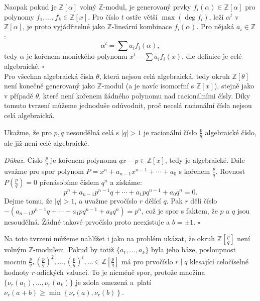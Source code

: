 \documentclass[12pt]{report}
\begin{document}
Naopak pokud je $\mathbb{Z}[\alpha]$ volný $\mathbb{Z}$-modul, je generovaný prvky $f_i(\alpha) \in \mathbb{Z}[\alpha]$ pro polynomy $f_1,\dots,f_k \in \mathbb{Z}[x]$. Pro číslo $t$ ostře větší $\max{(\deg f_i)}$, leží $\alpha^t$ v $\mathbb{Z}[\alpha]$, je proto vyjádřitelné jako $\mathbb{Z}$-lineární kombinace $f_i(\alpha)$. Pro nějaká $a_i \in \mathbb{Z}$:
\begin{equation*}
\alpha^t = \sum a_i f_i(\alpha),
\end{equation*}
tedy $\alpha$ je kořenem monického polynomu $x^t - \sum a_i f_i(x)$, dle definice je celé algebraické. \hfill $\square$\\

Pro všechna algebraická čísla $\theta$, která nejsou celá algebraická, tedy okruh $\mathbb{Z}[\theta]$ není konečně generovaný jako $\mathbb{Z}$-modul (a je navíc isomorfní s $\mathbb{Z}[x]$), stejně jako v případě $\theta$, které není kořenem žádného polynomu nad racionálními čísly.  Díky tomuto tvrzení můžeme jednoduše odůvodnit, proč necelá racionální čísla nejsou celá algebraická.
\begin{priklad}\label{racalg}
Ukažme, že pro $p,q$ nesoudělná celá s $\vert q\vert > 1$ je racionální číslo $\frac{p}{q}$ algebraické číslo, ale již není celé algebraické.
\end{priklad}
\noindent \textit{Důkaz.} Číslo $\frac{p}{q}$ je kořenem polynomu $qx-p \in \mathbb{Z}[x]$, tedy je algebraické. Dále uvažme pro spor polynom $P = x^n + a_{n-1} x^{n-1} + \cdots  + a_0$ s kořenem $\frac{p}{q}$. Rovnost $P\left(\frac{p}{q} \right)=0$ přenásobíme číslem $q^n$ a získáme:
\begin{equation*}
p^n + a_{n-1} p^{n-1} q + \cdots + a_1 p q^{n-1} + a_0 q^n = 0.
\end{equation*}
Dejme tomu, že $\vert q \vert > 1$, a uvažme prvočíslo $r$ dělící $q$. Pak $r$ dělí číslo $-(a_{n-1} p^{n-1} q + \cdots + a_1 p q^{n-1} + a_0 q^n) = p^n$, což je spor s faktem, že $p$ a $q$ jsou nesoudělná. Žádné takové prvočíslo proto neexistuje a $b = \pm 1$. \hfill $\square$ 

\begin{poznamka}
Na toto tvrzení můžeme nahlížet i jako na problém ukázat, že okruh $\mathbb{Z}\left[\frac{p}{q}\right]$ není volným $\mathbb{Z}$-modulem. Pokud by totiž $\lbrace a_1,\dots,a_k \rbrace$ byla jeho báze, posloupnost mocnin $\frac{p}{q}, \left(\frac{p}{q}\right)^2, \dots, \left(\frac{p}{q}\right)^i, \dots \in \mathbb{Z}\left[\frac{p}{q}\right]$ má pro prvočíslo $r \mid q$ klesající celočíselné hodnoty $r$-adických valuací. To je nicméně spor, protože množina $\lbrace \nu_r(a_1),\dots,\nu_r(a_k) \rbrace$ je zdola omezená a~platí $\nu_r(a+b) \geqslant \min\left\lbrace\nu_r(a),\nu_r(b)\right\rbrace$.
\end{poznamka}
\end{document}
